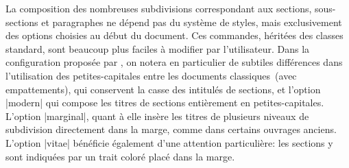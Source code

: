 \begin{noprint}
{	%
	\renewcommand{\thechapter}{\roman{chapter}}
	\renewcommand{\chaptitlefont}{\raggedright\Large\chaptercolour\sffamily\scshape}
	\renewcommand{\chapnamefont}{\chaptitlefont}
	\renewcommand{\chapnumfont}{\chaptitlefont}
	\renewcommand{\chapternamenum}{\space}
	\renewcommand{\printchapternum}{%
		\chapnumfont%
		\ifanappendix					\Alph{chapter}%
		\else\ifdefstring{\languagename}{french}
			{\ifnum\value{chapter}=1	\ordinalstring{chapter}[m]%
			 \else						\thechapter\fi}
			{\thechapter}\fi}
	\renewcommand{\@chapapp}{\chapnamefont\MakeLowercase\chaptername}
	\renewcommand{\printchaptertitle}[1]{\chaptitlefont\MakeUppercase{##1}}
	\renewcommand{\afterchapternum}{\par\nobreak\vskip\midchapskip}
	\setlength{\beforechapskip}{\baselinestretch\addto@Large}
	\addtolength{\beforechapskip}{\baselineskip}
	\setlength{\midchapskip}{\baselinestretch\addto@Large}
	\setlength{\afterchapskip}{2\baselineskip}
	\renewcommand{\chapterblock}{%
		\setlength{\afterchapskip}{\baselineskip}}

}
\if@modern{}\fi
\end{noprint}

La composition des nombreuses subdivisions correspondant aux sections, sous-sections et paragraphes ne dépend pas du système de styles, mais exclusivement des options choisies au début du document. Ces commandes, héritées des classes standard, sont beaucoup plus faciles à modifier par l'utilisateur. Dans la configuration proposée par \frenchlaw, on notera en particulier de subtiles différences dans l'utilisation des petites-capitales entre les documents classiques~(avec empattements), qui conservent la casse des intitulés de sections, et l'option |modern| qui compose les titres de sections entièrement en petites-capitales. L'option |marginal|, quant à elle insère les titres de plusieurs niveaux de subdivision directement dans la marge, comme dans certains ouvrages anciens. L'option |vitae| bénéficie également d'une attention particulière: les sections y sont indiquées par un trait coloré placé dans la marge.

\begin{noprint}
\end{noprint}

